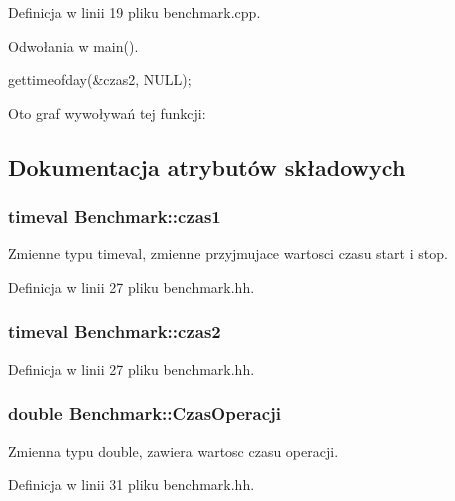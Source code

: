 \-Definicja w linii 19 pliku benchmark.\-cpp.



\-Odwołania w main().


\begin{DoxyCode}
{
        gettimeofday(&czas2, NULL);
}
\end{DoxyCode}


\-Oto graf wywoływań tej funkcji\-:




\subsection{\-Dokumentacja atrybutów składowych}
\hypertarget{class_benchmark_a461847eb9a01e511e19af6cd7bcc057e}{
\subsubsection[{czas1}]{\setlength{\rightskip}{0pt plus 5cm}timeval {\bf \-Benchmark\-::czas1}}}\label{class_benchmark_a461847eb9a01e511e19af6cd7bcc057e}


\-Zmienne typu timeval, zmienne przyjmujace wartosci czasu start i stop. 



\-Definicja w linii 27 pliku benchmark.\-hh.

\hypertarget{class_benchmark_a56ec92a30b650825403d14907a321eea}{
\subsubsection[{czas2}]{\setlength{\rightskip}{0pt plus 5cm}timeval {\bf \-Benchmark\-::czas2}}}\label{class_benchmark_a56ec92a30b650825403d14907a321eea}


\-Definicja w linii 27 pliku benchmark.\-hh.

\hypertarget{class_benchmark_accd4af9649210ce216db513c0676c401}{
\subsubsection[{\-Czas\-Operacji}]{\setlength{\rightskip}{0pt plus 5cm}double {\bf \-Benchmark\-::\-Czas\-Operacji}}}\label{class_benchmark_accd4af9649210ce216db513c0676c401}


\-Zmienna typu double, zawiera wartosc czasu operacji. 



\-Definicja w linii 31 pliku benchmark.\-hh.

